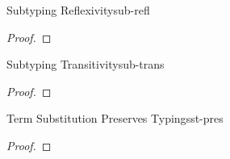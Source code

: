 \begin{lemma}{Subtyping Reflexivity}{sub-refl}

  \axiom{$\fa{\tau}{\sjdg{\tau}{\tau}}$}

  \begin{proof}
    \ind{$\sub$}
  \end{proof}

\end{lemma}

\begin{lemma}{Subtyping Transitivity}{sub-trans}

  \begin{conds}
  \end{conds}

  \then{}

  \begin{proof}
    \ind{\sub}
  \end{proof}

\end{lemma}

\begin{lemma}{Term Substitution Preserves Typing}{sst-pres}

  \begin{conds}
  \end{conds}

  \then{}

  \begin{proof}
  \end{proof}

\end{lemma}

